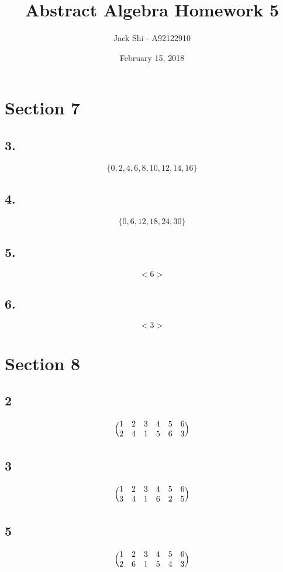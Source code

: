 \documentclass{article}
\title{Abstract Algebra Homework 5}
\author{Jack Shi - A92122910}
\date{February 15, 2018}
\begin{document}
\maketitle

\section*{Section 7}
\subsection*{3. }
$$\{0, 2, 4, 6, 8, 10, 12, 14, 16\}$$
\subsection*{4. }
$$\{0, 6, 12, 18, 24, 30\}$$
\subsection*{5. }
$$<6>$$
\subsection*{6. }
$$<3>$$

\section*{Section 8}
\subsection*{2}
\begin{equation*}
	\Bigl(\begin{matrix}
		1 & 2 & 3 & 4 & 5 & 6\\
		2 & 4 & 1 & 5 & 6 & 3\\
	\end{matrix}\Bigr)
\end{equation*}

\subsection*{3}
\begin{equation*}
	\Bigl(\begin{matrix}
		1 & 2 & 3 & 4 & 5 & 6\\
		3 & 4 & 1 & 6 & 2 & 5\\
	\end{matrix}\Bigr)
\end{equation*}

\subsection*{5}
\begin{equation*}
	\Bigl(\begin{matrix}
		1 & 2 & 3 & 4 & 5 & 6\\
		2 & 6 & 1 & 5 & 4 & 3\\
	\end{matrix}\Bigr)
\end{equation*}
\end{document}
